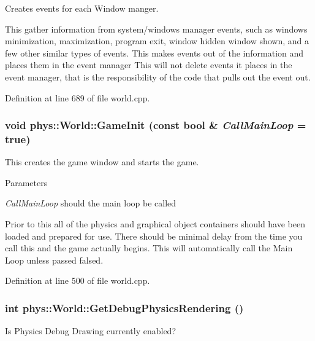 Creates events for each Window manger. 

This gather information from system/windows manager events, such as windows minimization, maximization, program exit, window hidden window shown, and a few other similar types of events. This makes events out of the information and places them in the event manager This will not delete events it places in the event manager, that is the responsibility of the code that pulls out the event out. 

Definition at line 689 of file world.cpp.

\hypertarget{classphys_1_1World_a21cc36be08a61f40619584d4c438936b}{
\subsubsection[{GameInit}]{\setlength{\rightskip}{0pt plus 5cm}void phys::World::GameInit (const bool \& {\em CallMainLoop} = {\ttfamily true})}}
\label{da/ddf/classphys_1_1World_a21cc36be08a61f40619584d4c438936b}


This creates the game window and starts the game. 


\begin{DoxyParams}{Parameters}
\item[{\em CallMainLoop}]should the main loop be called\end{DoxyParams}
Prior to this all of the physics and graphical object containers should have been loaded and prepared for use. There should be minimal delay from the time you call this and the game actually begins. This will automatically call the Main Loop unless passed falsed. 

Definition at line 500 of file world.cpp.

\hypertarget{classphys_1_1World_a92070d16eb81866b4393f0ed96fbcbbc}{
\subsubsection[{GetDebugPhysicsRendering}]{\setlength{\rightskip}{0pt plus 5cm}int phys::World::GetDebugPhysicsRendering ()}}
\label{da/ddf/classphys_1_1World_a92070d16eb81866b4393f0ed96fbcbbc}


Is Physics Debug Drawing currently enabled? 

